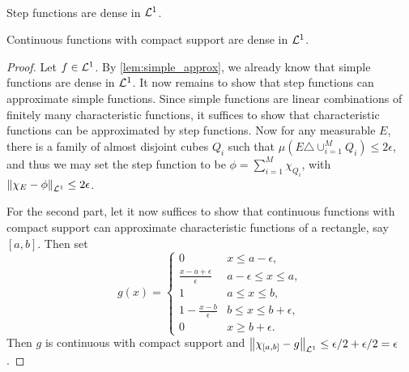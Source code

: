 \begin{proposition}\label{prop:conti_approx}\ \vspace{-1em}
    \begin{thmenum}
        \item Step functions are dense in $\mathcal{L}^1$.
        \item Continuous functions with compact support are dense 
        in $\mathcal{L}^1$.
    \end{thmenum}
\end{proposition}
\begin{proof}
    Let $f\in\mathcal{L}^1$. By \cref{lem:simple_approx}, we already know that 
    simple functions are dense in $\mathcal{L}^1$. It now remains to 
    show that step functions can approximate simple functions. 
    Since simple functions are linear combinations of finitely 
    many characteristic functions, it suffices to show that 
    characteristic functions can be approximated by step functions. 
    Now for any measurable $E$, there is a family of almost disjoint 
    cubes $Q_i$ such that $\mu(E\triangle \cup_{i=1}^MQ_i)\leq 
    2\epsilon$, and thus we may set the step function to be 
    $\phi = \sum_{i=1}^M\chi_{Q_i}$, with $\left\lVert {\chi_E-\phi} \right\rVert_{\mathcal{L}^1}
    \leq 2\epsilon$. 

    For the second part, let it now suffices to show that 
    continuous functions with compact support can approximate
    characteristic functions of a rectangle, say $[a,b]$. 
    Then set 
    \begin{equation*}
        g(x) = \begin{cases}
            0 & x\leq a-\epsilon, \\
            \frac{x-a+\epsilon}{\epsilon} & a-\epsilon\leq x\leq a, \\ 
            1 & a\leq x\leq b, \\
            1-\frac{x-b}{\epsilon} & b\leq x\leq b+\epsilon, \\
            0 & x\geq b+\epsilon.
        \end{cases}
    \end{equation*}
    Then $g$ is continuous with compact support and $\left\lVert {\chi_{[a,b]}-g} \right\rVert_{\mathcal{L}^1} 
    \leq \epsilon/2 + \epsilon/2 = \epsilon$.
\end{proof}